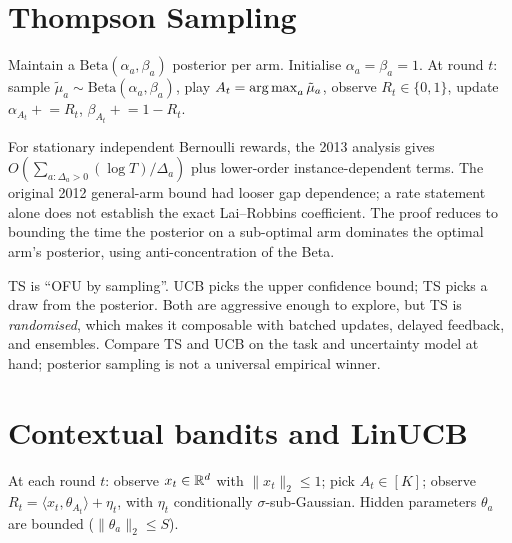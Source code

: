 \documentclass[11pt,oneside]{scrbook}
\begin{document}
\section{Thompson Sampling}

\begin{definition}
Maintain a $\mathrm{Beta}(\alpha_a, \beta_a)$ posterior per arm. Initialise
$\alpha_a = \beta_a = 1$. At round $t$: sample $\tilde\mu_a \sim
\mathrm{Beta}(\alpha_a, \beta_a)$, play $A_t = \operatorname*{arg\,max}_a \tilde\mu_a$, observe
$R_t \in \{0,1\}$, update $\alpha_{A_t} \mathrel{+}= R_t$,
$\beta_{A_t} \mathrel{+}= 1 - R_t$.
\end{definition}

\begin{theorem}
For stationary independent Bernoulli rewards, the 2013 analysis gives
$O(\sum_{a:\Delta_a>0}(\log T)/\Delta_a)$ plus lower-order
instance-dependent terms. The original 2012 general-arm bound had looser
gap dependence; a rate statement alone does not establish the exact
Lai--Robbins coefficient. The proof reduces to bounding the time the
posterior on a sub-optimal arm dominates the optimal arm's posterior, using
anti-concentration of the Beta.
\end{theorem}

\begin{intuition}
TS is ``OFU by sampling''. UCB picks the upper confidence bound; TS picks a
draw from the posterior. Both are aggressive enough to explore, but TS is
\emph{randomised}, which makes it composable with batched updates, delayed
feedback, and ensembles. Compare TS and UCB on the task and uncertainty model at hand;
posterior sampling is not a universal empirical winner.
\end{intuition}

\section{Contextual bandits and LinUCB}

\begin{definition}
At each round $t$: observe $x_t \in \mathbb{R}^d$ with $\|x_t\|_2 \leq 1$; pick
$A_t \in [K]$; observe $R_t = \langle x_t, \theta_{A_t}\rangle + \eta_t$,
with $\eta_t$ conditionally $\sigma$-sub-Gaussian. Hidden parameters
$\theta_a$ are bounded ($\|\theta_a\|_2 \leq S$).
\end{definition}
\end{document}
